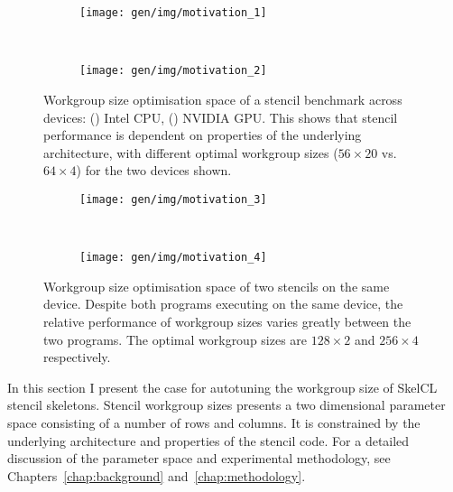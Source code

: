 \begin{figure}
\centering
\begin{subfigure}[h]{.49\textwidth}
\centering
\texttt{[image: gen/img/motivation\_1]}
\vspace{-1.5em} %
\caption{}
\label{fig:motivation-1}
\end{subfigure}
~%
\begin{subfigure}[h]{.49\textwidth}
\centering
\texttt{[image: gen/img/motivation\_2]}
\vspace{-1.5em} %
\caption{}
\label{fig:motivation-2}
\end{subfigure}
\caption{%
  Workgroup size optimisation space of a stencil benchmark across
  devices: () Intel CPU,
  () NVIDIA GPU. This shows that stencil
  performance is dependent on properties of the underlying
  architecture, with different optimal workgroup sizes ($56 \times 20$
  vs.\ $64 \times 4$) for the two devices shown.%
}
\label{fig:motivation-arch}
\end{figure}

\begin{figure}
\begin{subfigure}[h]{.49\textwidth}
\centering
\texttt{[image: gen/img/motivation\_3]}
\vspace{-1.5em} %
\caption{}
\label{fig:motivation-3}
\end{subfigure}
~%
\begin{subfigure}[h]{.49\textwidth}
\centering
\texttt{[image: gen/img/motivation\_4]}
\vspace{-1.5em} %
\caption{}
\label{fig:motivation-4}
\end{subfigure}
\caption{%
  Workgroup size optimisation space of two stencils on the same
  device. Despite both programs executing on the same device, the
  relative performance of workgroup sizes varies greatly between the
  two programs. The optimal workgroup sizes are $128\times2$ and
  $256\times4$ respectively.%
}
\label{fig:motivation-prog}
\end{figure}

In this section I present the case for autotuning the workgroup size
of SkelCL stencil skeletons. Stencil workgroup sizes presents a two
dimensional parameter space consisting of a number of rows and
columns. It is constrained by the underlying architecture and
properties of the stencil code. For a detailed discussion of the
parameter space and experimental methodology, see
Chapters~\ref{chap:background} and~\ref{chap:methodology}.

